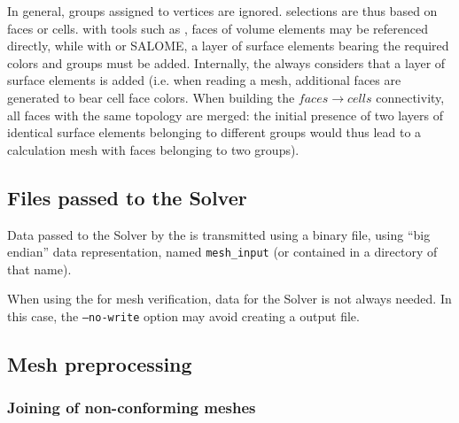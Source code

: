 {{{{In general, groups assigned to vertices are ignored.
selections are thus based on faces or cells. with tools such
as \simail, faces of volume elements may be referenced directly, while
with \ideas or SALOME, a layer of surface elements bearing the required
colors and groups must be added. Internally, the \pcs always considers
that a layer of surface elements is added (i.e. when reading a \simail
mesh, additional faces are generated to bear cell face colors.
When building the $faces \rightarrow cells$ connectivity, all faces with the
same topology are merged: the initial presence of two layers of identical
surface elements belonging to different groups would thus lead to
a calculation mesh with faces belonging to two groups).

\subsection{Files passed to the Solver\label{sec:pcs:mode_comm}}

Data passed to the Solver by the \pcs is transmitted using a
binary file, using ``big endian'' data representation, named
\texttt{mesh\_input} (or contained in a directory of that name).

When using the \pcs for mesh verification, data for the Solver
is not always needed. In this case, the \texttt{--no-write} option may
avoid creating a \pcs output file.

\subsection{Mesh preprocessing%
\label{sec:prepro}}

\subsubsection{Joining of non-conforming meshes}\label{sec:optpcs:join}

}}}}
